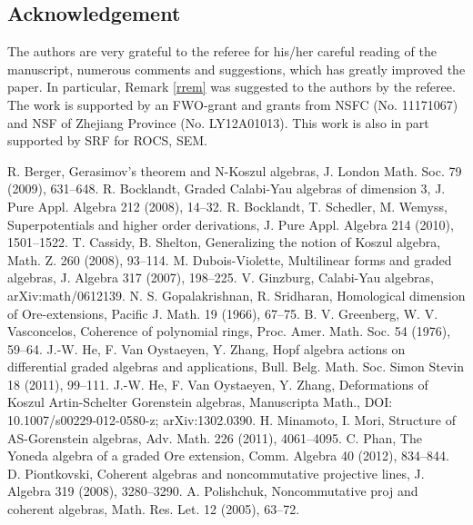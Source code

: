 \documentclass[a4paper]{amsart}
\begin{document}
\vspace{5mm}

\subsection*{Acknowledgement}
The authors are very grateful to the referee for his/her careful reading of the manuscript, numerous comments and suggestions, which has greatly improved the paper. In particular, Remark \ref{rrem} was suggested to the authors by the referee. The work is supported by an FWO-grant and grants from NSFC (No. 11171067) and NSF of Zhejiang Province (No. LY12A01013). This work is also in part supported by SRF for ROCS, SEM.

\vspace{5mm}


\begin{thebibliography}{99}
 R. Berger, Gerasimov's theorem and N-Koszul algebras, J. London Math. Soc. 79 (2009), 631--648.
 R. Bocklandt, Graded Calabi-Yau algebras of dimension 3, J. Pure Appl. Algebra 212 (2008), 14--32.
 R. Bocklandt, T. Schedler, M. Wemyss, Superpotentials and higher order derivations, J. Pure Appl. Algebra 214 (2010), 1501--1522.
 T. Cassidy, B. Shelton, Generalizing the notion of Koszul algebra, Math. Z. 260 (2008), 93--114.
 M. Dubois-Violette, Multilinear forms and graded algebras, J. Algebra 317 (2007), 198--225.
 V. Ginzburg, Calabi-Yau algebras, arXiv:math/0612139.
 N. S. Gopalakrishnan, R. Sridharan, Homological dimension of Ore-extensions, Pacific J. Math. 19 (1966), 67--75.
 B. V. Greenberg, W. V. Vasconcelos, Coherence of polynomial rings, Proc. Amer. Math. Soc. 54 (1976), 59--64.
 J.-W. He, F. Van Oystaeyen, Y. Zhang, Hopf algebra actions on differential graded algebras and applications, Bull. Belg. Math. Soc. Simon Stevin 18 (2011), 99--111.
 J.-W. He, F. Van Oystaeyen, Y. Zhang, Deformations of Koszul Artin-Schelter Gorenstein algebras, Manuscripta Math., DOI: 10.1007/s00229-012-0580-z; arXiv:1302.0390.
 H. Minamoto, I. Mori, Structure of AS-Gorenstein algebras, Adv. Math. 226 (2011), 4061--4095.
 C. Phan, The Yoneda algebra of a graded Ore extension, Comm. Algebra 40 (2012), 834--844.
 D. Piontkovski, Coherent algebras and noncommutative projective lines, J. Algebra 319 (2008), 3280--3290.
 A. Polishchuk, Noncommutative proj and coherent algebras, Math. Res. Let. 12 (2005), 63--72.

\end{thebibliography}
\end{document}
